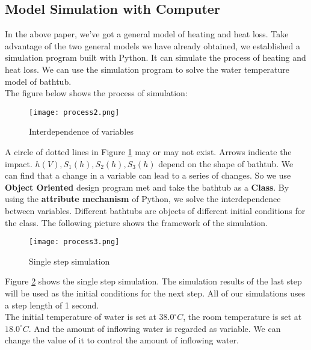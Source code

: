 \documentclass{mcmthesis}
\begin{document}
\subsection{Model Simulation with Computer}
\indent In the above paper, we've got a general model of heating and heat loss. Take advantage of the two general models we have already obtained, we established a simulation program built with Python. It can simulate the process of heating and heat loss. We can use the simulation program to solve the water temperature model of bathtub.\\
\indent The figure below shows the process of simulation:
\begin{figure}[H]	%
	\centerline{\texttt{[image: process2.png]}}
	\caption{Interdependence of variables}
	\label{interdependence}
\end{figure}
\indent A circle of dotted lines in Figure \ref{interdependence} may or may not exist. Arrows indicate the impact. $h(V),S_{1}(h),S_{2}(h),S_{3}(h)$ depend on the shape of bathtub. We can find that a change in a variable can lead to a series of changes. So we use \textbf{Object Oriented} design program met and take the bathtub as a \textbf{Class}. By using the \textbf{attribute mechanism} of Python, we solve the interdependence between variables. Different bathtubs are objects of different initial conditions for the class. The following picture shows the framework of the simulation.\\
\begin{figure}[H]	%
	\centerline{\texttt{[image: process3.png]}}
	\caption{Single step simulation}
	\label{process}
\end{figure}
\indent Figure \ref{process} shows the single step simulation. The simulation results of the last step will be used as the initial conditions for the next step. All of our simulations uses a step length of 1 second.\\
\indent The initial temperature of water is set at $38.0^{\circ}C$, the room temperature is set at $18.0^{\circ}C$. And the amount of inflowing water is regarded as variable. We can change the value of it to control the amount of inflowing water.\\
\end{document}
